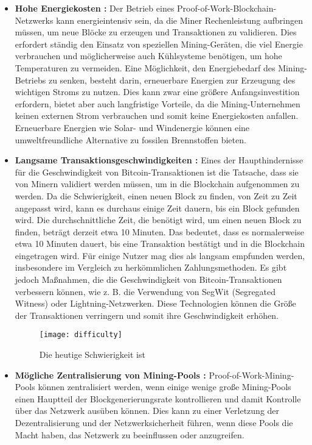 \begin{itemize}
	\item \textbf{Hohe Energiekosten :} Der Betrieb eines Proof-of-Work-Blockchain-Netzwerks kann energieintensiv sein, da die Miner Rechenleistung aufbringen müssen, um neue Blöcke zu erzeugen und Transaktionen zu validieren. Dies erfordert ständig den Einsatz von speziellen Mining-Geräten, die viel Energie verbrauchen und möglicherweise auch Kühlsysteme benötigen, um hohe Temperaturen zu vermeiden. Eine Möglichkeit, den Energiebedarf des Mining-Betriebs zu senken, besteht darin, erneuerbare Energien zur Erzeugung des wichtigen Stroms zu nutzen. Dies kann zwar eine größere Anfangsinvestition erfordern, bietet aber auch langfristige Vorteile, da die Mining-Unternehmen keinen externen Strom verbrauchen und somit keine Energiekosten anfallen. Erneuerbare Energien wie Solar- und Windenergie können eine umweltfreundliche Alternative zu fossilen Brennstoffen bieten.
	
	\item \textbf{Langsame Transaktionsgeschwindigkeiten :} Eines der Haupthindernisse für die Geschwindigkeit von Bitcoin-Transaktionen ist die Tatsache, dass sie von Minern validiert werden müssen, um in die Blockchain aufgenommen zu werden. Da die Schwierigkeit, einen neuen Block zu finden, von Zeit zu Zeit angepasst wird, kann es durchaus einige Zeit dauern, bis ein Block gefunden wird. Die durchschnittliche Zeit, die benötigt wird, um einen neuen Block zu finden, beträgt derzeit etwa 10 Minuten. Das bedeutet, dass es normalerweise etwa 10 Minuten dauert, bis eine Transaktion bestätigt und in die Blockchain eingetragen wird. Für einige Nutzer mag dies als langsam empfunden werden, insbesondere im Vergleich zu herkömmlichen Zahlungsmethoden. Es gibt jedoch Maßnahmen, die die Geschwindigkeit von Bitcoin-Transaktionen verbessern können, wie z. B. die Verwendung von SegWit (Segregated Witness) oder Lightning-Netzwerken. Diese Technologien können die Größe der Transaktionen verringern und somit ihre Geschwindigkeit erhöhen.
	\begin{figure}[H]
		\centering
		\texttt{[image: difficulty]}
		\caption{Die heutige Schwierigkeit ist}
		\small \cite{five_image}
	\end{figure} 
	
	\item \textbf{Mögliche Zentralisierung von Mining-Pools :} Proof-of-Work-Mining-Pools können zentralisiert werden, wenn einige wenige große Mining-Pools einen Hauptteil der Blockgenerierungsrate kontrollieren und damit Kontrolle über das Netzwerk ausüben können.  Dies kann zu einer Verletzung der Dezentralisierung und der Netzwerksicherheit führen, wenn diese Pools die Macht haben, das Netzwerk zu beeinflussen oder anzugreifen.
	

\end{itemize}
